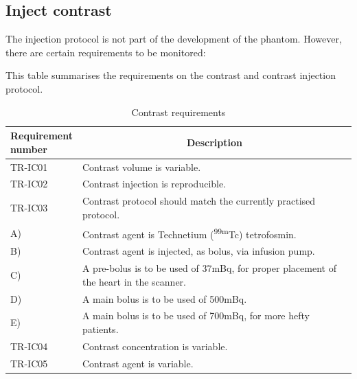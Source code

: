 \subsection{Inject contrast}
\label{sec:inj_contrast}
The injection protocol is not part of the development of the phantom. However, there are certain requirements to be monitored:
\begin{table} [H]
\caption{Contrast requirements}
\label{tab:injcon}
This table summarises the requirements on the contrast and contrast injection protocol.
\begin{tabular}{l|p{120mm}|}
	\makecell[l]{\textbf{Requirement} \\ \textbf{number}} & \multicolumn{1}{c}{\textbf{Description}}\\
	\hline
	TR-IC01 & Contrast volume is variable. \\
	TR-IC02 & Contrast injection is reproducible. \\
	TR-IC03 & Contrast protocol should match the currently practised protocol. \\
	\hspace{1.5cm} A) & Contrast agent is Technetium (\textsuperscript{99m}Tc) tetrofosmin. \\
	\hspace{1.5cm} B) & Contrast agent is injected, as bolus, via infusion pump. \\
	\hspace{1.5cm} C) & A pre-bolus is to be used of 37mBq, for proper placement of the heart in the scanner. \\
	\hspace{1.5cm} D) & A main bolus is to be used of 500mBq. \\
	\hspace{1.5cm} E) & A main bolus is to be used of 700mBq, for more hefty patients. \\
	TR-IC04 & Contrast concentration is variable. \\
	TR-IC05 & Contrast agent is variable. \\
	\cline{2-2}
\end{tabular}
\end{table}

